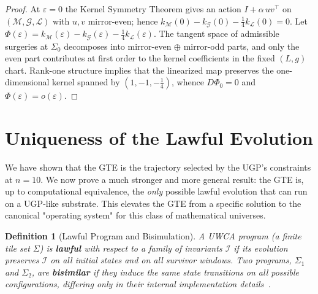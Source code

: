 \documentclass[12pt]{article}
\newtheorem{definition}[theorem]{Definition}
\numberwithin{equation}{section}
\newcommand{\M}{\mathcal{M}}
\newcommand{\G}{\mathcal{G}}
\newcommand{\LL}{\mathcal{L}}
\begin{document}
\begin{proof}
At $\varepsilon=0$ the Kernel Symmetry Theorem gives an action $I+\alpha\,u v^\top$ on $(\M,\G,\LL)$ with $u,v$ mirror-even; hence $k_{\M}(0)-k_{\G}(0)-\tfrac14k_{\LL}(0)=0$. Let $\Phi(\varepsilon)=k_{\M}(\varepsilon)-k_{\G}(\varepsilon)-\tfrac14k_{\LL}(\varepsilon)$. The tangent space of admissible surgeries at $\Sigma_0$ decomposes into mirror-even $\oplus$ mirror-odd parts, and only the even part contributes at first order to the kernel coefficients in the fixed $(L,g)$ chart. Rank-one structure implies that the linearized map preserves the one-dimensional kernel spanned by $(1,-1,-\tfrac14)$, whence $D\Phi_0=0$ and $\Phi(\varepsilon)=o(\varepsilon)$.
\end{proof}

\section{Uniqueness of the Lawful Evolution}
\label{sec:lawful_uniqueness}
We have shown that the GTE is the trajectory selected by the UGP's constraints at $n=10$. We now prove a much stronger and more general result: the GTE is, up to computational equivalence, the \emph{only} possible lawful evolution that can run on a UGP-like substrate. This elevates the GTE from a specific solution to the canonical "operating system" for this class of mathematical universes.

\begin{definition}[Lawful Program and Bisimulation]
A UWCA program (a finite tile set $\Sigma$) is \textbf{lawful} with respect to a family of invariants $\mathcal{I}$ if its evolution preserves $\mathcal{I}$ on all initial states and on all survivor windows. Two programs, $\Sigma_1$ and $\Sigma_2$, are \textbf{bisimilar} if they induce the same state transitions on all possible configurations, differing only in their internal implementation details~\cite{SpivackUGPFormalization,ugp-lean}.
\end{definition}
\end{document}
